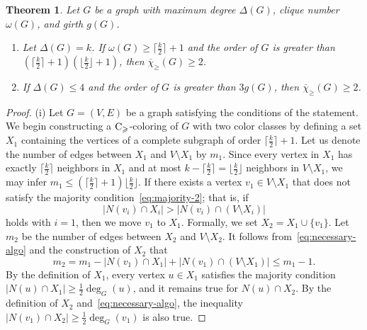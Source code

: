 \documentclass{article}
\newtheorem{theorem}{Theorem}
\theoremstyle{definition}
\newcommand{\mc}{\overline{\chi}_{\geqslant}}
\newcommand{\cg}{{\rm C}_{\geqslant}}
\begin{document}
\begin{theorem} \label{thm:partitionable} \label{thm:girth}
Let $G$ be a graph with maximum degree $\Delta(G)$, clique number $\omega(G)$, and girth $g(G)$.
\begin{enumerate}
[label=\normalfont(\roman*)]
    \item Let $\Delta(G)=k$. If $\omega(G) \geq \lceil \frac{k}{2}\rceil+1$ and the order of $G$ is greater than $(\lceil\frac{k}{2}\rceil +1)(\lfloor \frac{k}{2}\rfloor +1)$, then $\mc(G)\geq 2$.
     \item If $\Delta(G) \leq 4$ and the order of $G$ is greater than $3g(G)$, then $\mc(G)\geq 2$.
\end{enumerate}  
\end{theorem}
\begin{proof}
    (i) Let $G=(V,E)$ be a graph satisfying the conditions of the statement. We begin constructing a $\cg$-coloring of $G$ with two color classes by defining a set $X_1$ containing the vertices of a complete subgraph of order $\lceil \frac{k}{2} \rceil+1$.
    Let us denote the number of edges between $X_1$ and $V\setminus X_1$ by $m_1$. 
    Since every vertex in $X_1$ has exactly $\lceil \frac{k}{2} \rceil$ neighbors in $X_1$ and at most $k-\lceil \frac{k}{2} \rceil = \lfloor \frac{k}{2} \rfloor$ neighbors in $V \setminus X_1$,  
    we may infer $m_1 \leq (\lceil\frac{k}{2}\rceil +1)\lfloor \frac{k}{2}\rfloor$.
    If there exists a vertex $v_1 \in V\setminus X_1$ that does not satisfy the majority condition~\eqref{eq:majority-2}; that is, if 
    \begin{equation} \label{eq:necessary-algo}
        |N(v_i) \cap X_i| > |N(v_i) \cap (V \setminus X_i)|
    \end{equation}
    holds with $i=1$, 
    then we move $v_1$ to $X_1$. Formally, we set $X_2=X_1 \cup \{v_1\}$. Let $m_2$ be the number of edges between $X_2$ and $V\setminus X_2$. It follows from~\eqref{eq:necessary-algo} and the construction of $X_2$ that
    \begin{equation*} %
       m_2= m_1 - |N(v_1) \cap X_1| + |N(v_1) \cap (V \setminus X_1)| \leq m_1-1. 
    \end{equation*}
    By the definition of $X_1$, every vertex $u \in X_1$ satisfies the majority condition $|N(u) \cap X_1| \ge \frac{1}{2} \deg_G(u)$, and it remains true for $N(u) \cap X_2$. By the definition of $X_2$ and~\eqref{eq:necessary-algo}, the inequality $|N(v_1) \cap X_2| \ge \frac{1}{2} \deg_G(v_1)$ is also true.
    

\end{proof}
\end{document}
